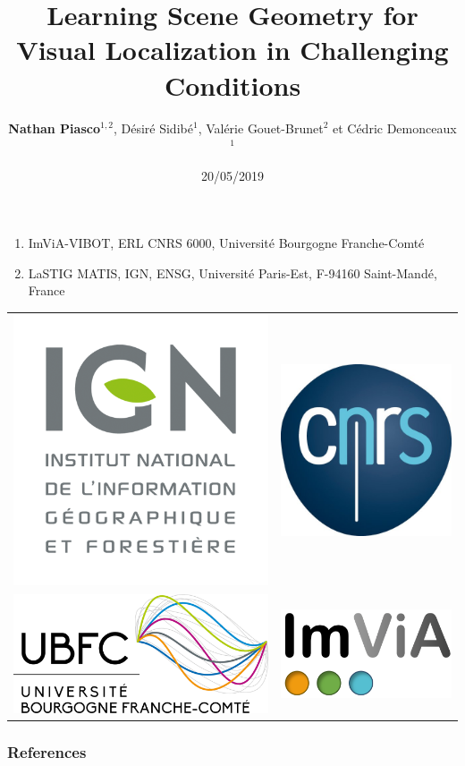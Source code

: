 \documentclass[9pt, aspectratio=169]{beamer}
\title{Learning Scene Geometry for Visual Localization in Challenging Conditions}
\author{\textbf{Nathan Piasco$^{1,2}$}, Désiré Sidibé$^{1}$, Valérie Gouet-Brunet$^{2}$ et Cédric Demonceaux$^{1}$}
\institute{2019 International Conference on Robotics and Automation} %
\date{20/05/2019}
\begin{document}
\begin{frame}[plain,c]
	\titlepage
	\begin{minipage}{0.49\textwidth}
	\centering
		\begin{enumerate}
			\item ImViA-VIBOT, 	ERL CNRS  6000,  Universit\'e  Bourgogne Franche-Comt\'e
			\item LaSTIG MATIS, IGN, ENSG, Universit\'e Paris-Est, 	F-94160 Saint-Mand\'e, France
		\end{enumerate}
	\end{minipage}\hfill
	\begin{minipage}{0.49\textwidth}
	\centering
	\begin{tabular}{c c}
		\includegraphics[width=0.15\linewidth]{images/logos/ign_logo} & 
			\includegraphics[width=0.15\linewidth]{images/logos/cnrs} \\
					\includegraphics[width=0.27\linewidth]{images/logos/ubfc} &
							\includegraphics[width=0.25\linewidth]{images/logos/imvia} \\
	\end{tabular}
	\end{minipage}
\end{frame}





%
%
%

\begin{frame}
\frametitle{References}

\scriptsize{}

\end{frame}

\appendix
\end{document}

